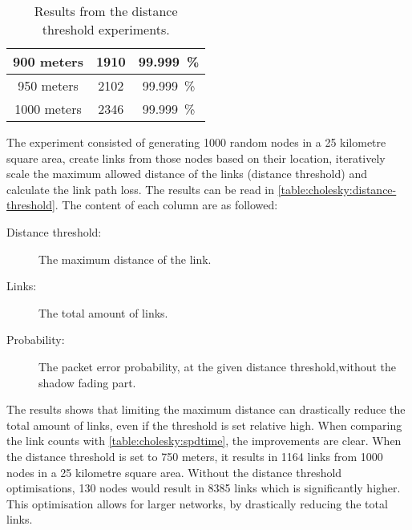 \begin{table}[H]
\begin{tabular}{|c|c|c|}
        900 meters         & 1910  & 99.999~\%   \\\hline %
        950 meters         & 2102  & 99.999~\%   \\\hline %
        1000 meters        & 2346  & 99.999~\%   \\\hline %
    \end{tabular}
    \caption{Results from the distance threshold experiments.}
    \label{table:cholesky:distance-threshold}
\end{table}

The experiment consisted of generating 1000 random nodes in a 25 kilometre square area, create links from those nodes based on their location, iteratively scale the maximum allowed distance of the links (distance threshold) and calculate the link path loss. The results can be read in \autoref{table:cholesky:distance-threshold}. The content of each column are as followed:

\begin{description}
    \item[Distance threshold:] The maximum distance of the link.
    \item[Links:] The total amount of links.
    \item[Probability:] The packet error probability, at the given distance threshold,without the shadow fading part.
\end{description}


The results shows that limiting the maximum distance can drastically reduce the total amount of links, even if the threshold is set relative high. When comparing the link counts with \autoref{table:cholesky:spdtime}, the improvements are clear. When the distance threshold is set to 750 meters, it results in 1164 links from 1000 nodes in a 25 kilometre square area. Without the distance threshold optimisations, 130 nodes would result in 8385 links which is significantly higher. This optimisation allows for larger networks, by drastically reducing the total links.



